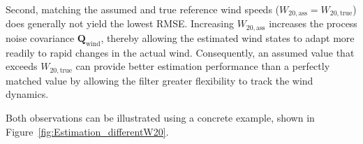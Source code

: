 Second, matching the assumed and true reference wind speeds ($W_{20,\mathrm{ass}} = W_{20,\mathrm{true}}$) does generally not yield the lowest RMSE. 
Increasing $W_{20,\mathrm{ass}}$ increases the process noise covariance $\bm{Q}_{\mathrm{wind}}$, thereby allowing the estimated wind states to adapt more readily to rapid changes in the actual wind. Consequently, an assumed value that exceeds $W_{20,\mathrm{true}}$ can provide better estimation performance than a perfectly matched value by allowing the filter greater flexibility to track the wind dynamics. 

Both observations can be illustrated using a concrete example, shown in Figure~\ref{fig:Estimation_differentW20}.

